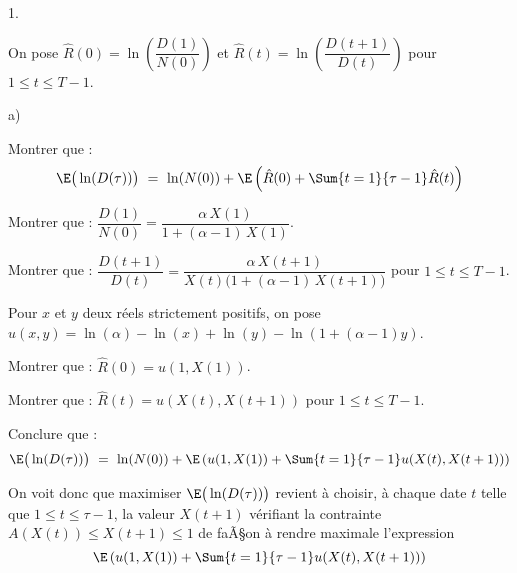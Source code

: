 \documentclass[11pt]{article}%
\begin{document}
\begin{noliste}{1.}
  
  
  
  
  \noindent
  On pose $\hat{R}(0) = \ln \left( \dfrac{D(1)}{N(0)}\right)$ et 
  $\hat{R}(t) = \ln \left( \dfrac{D(t+1)}{D(t)}\right)$ pour $1 \leq t 
  \leq T-1$.
  
  \item 
  \begin{noliste}{a)}
    \setlength{\itemsep}{2mm}
    \item Montrer que :
    \[
      \E\big(\ln(D(\tau))\big) \ = \ \ln(N(0)) + \E\left( \hat{R}(0)
      + \Sum{t=1}{\tau -1} \hat{R}(t)\right)
    \]
    
    
    
    \item Montrer que : $\dfrac{D(1)}{N(0)} = \dfrac{\alpha \, X(1)}
    {1+(\alpha-1) \, X(1)}$.
    
    
        
    \item Montrer que : $\dfrac{D(t+1)}{D(t)} = \dfrac{\alpha \, X(t+1)}
    {X(t) \big(1+ (\alpha -1) \, X(t+1)\big)}$ pour $1 \leq t \leq 
    T-1$.
    
    

    
    
    
    Pour $x$ et $y$ deux réels strictement positifs, on pose $u(x,y)=
    \ln(\alpha) - \ln(x) + \ln(y) - \ln(1+(\alpha-1)y)$.
    
    \item Montrer que : $\hat{R}(0) = u(1,X(1))$.
    
    

    
    \item Montrer que : $\hat{R}(t) = u(X(t),X(t+1))$ pour 
    $1 \leq t \leq T-1$.
    
    
        
    \item Conclure que :
    \[
      \E\big(\ln(D(\tau))\big) \ = \ \ln(N(0)) + \E\left( u(1,X(1)) + 
      \Sum{t=1}{\tau -1} u(X(t),X(t+1))\right)
    \]
    
    
  \end{noliste}
\end{noliste}

\noindent
On voit donc que maximiser $\E\big(\ln(D(\tau))\big)$ revient à choisir,
à chaque date $t$ telle que $1 \leq t \leq \tau -1$, la valeur $X(t+1)$ 
vérifiant la contrainte $A(X(t)) \leq X(t+1) \leq 1$ de faÃ§on à rendre 
maximale l'expression
\[
  \E\left(u(1,X(1)) + \Sum{t=1}{\tau-1} u(X(t), X(t+1))\right)
\]
\end{document}
